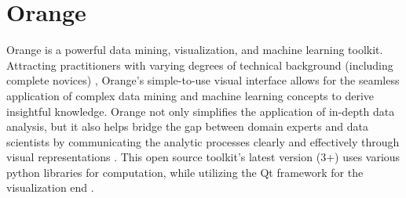 \section{Orange}

Orange \cite{hid-sp18-504-orange} is a powerful data mining, visualization, 
and machine learning toolkit. Attracting practitioners with varying degrees of
technical background (including complete novices) \cite{hid-sp18-504-orange}, 
Orange's simple-to-use visual interface allows for the seamless application of 
complex data mining and machine learning concepts to derive insightful 
knowledge. Orange not only simplifies the application of in-depth data 
analysis, but it also helps bridge the gap between domain experts and 
data scientists by communicating the analytic processes clearly and 
effectively through visual representations \cite{hid-sp18-504-orange}. 
This open source toolkit's latest version (3+) uses various python libraries 
for computation, while utilizing the Qt framework for the visualization 
end \cite{hid-sp18-504-wiki-orange}.